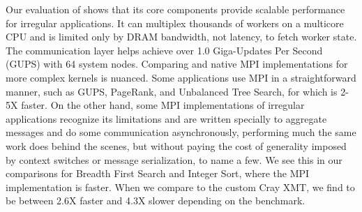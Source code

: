Our evaluation of \Grappa shows that its core components provide scalable performance for irregular applications.  It can multiplex thousands of workers on a multicore CPU and is limited only by DRAM bandwidth, not latency, to fetch worker state.  The communication layer helps \Grappa achieve over 1.0 Giga-Updates Per Second (GUPS) with 64 system nodes. Comparing \Grappa and native MPI implementations for more complex kernels is nuanced. Some applications use MPI in a straightforward manner, such as GUPS, PageRank, and Unbalanced Tree Search, for which \Grappa is 2-5X faster. On the other hand, some MPI implementations of irregular applications recognize its limitations and are written specially to aggregate messages and do some communication asynchronously, performing much the same work \Grappa does behind the scenes, but without paying the cost of generality imposed by context switches or message serialization, to name a few. We see this in our comparisons for Breadth First Search and Integer Sort, where the MPI implementation is  faster.
When we compare \Grappa to the custom Cray XMT, we find \Grappa to be between 2.6X faster and 4.3X slower depending on the benchmark.
